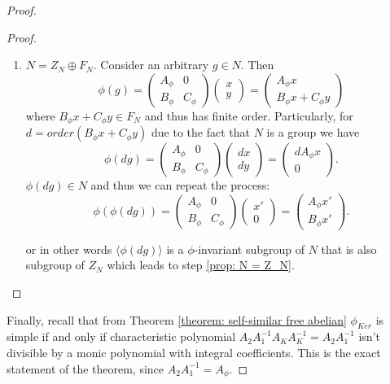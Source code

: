 \documentclass[a4paper,12pt]{amsart}
\theoremstyle{definition}
\begin{document}
\begin{proof}
\begin{proof}
\begin{enumerate}
				\item $N = Z_N \oplus F_N$. Consider an arbitrary $g \in N$. Then 
				$$
				\phi(g) = 
				\begin{pmatrix}
					A_\phi & 0 \\ 
					B_\phi & C_\phi   
				\end{pmatrix}
				\begin{pmatrix}
					x \\
					y
				\end{pmatrix}
				= \begin{pmatrix}
					A_\phi x \\ 
					B_\phi x + C_\phi y
				\end{pmatrix}
				$$ 
				where $B_\phi x + C_\phi y \in F_N$ and thus has finite order. Particularly, for $d = order(B_\phi x + C_\phi y)$ due to the fact that $N$ is a group we have 
				$$
				\phi(dg) = 
				\begin{pmatrix}
					A_\phi & 0 \\ 
					B_\phi & C_\phi   
				\end{pmatrix}
				\begin{pmatrix}
					dx \\
					dy
				\end{pmatrix}
				= \begin{pmatrix}
					dA_\phi x \\ 
					0
				\end{pmatrix}.
				$$
				$\phi(dg) \in N$ and thus we can repeat the process: 
				$$
				\phi(\phi(dg)) = 
				\begin{pmatrix}
					A_\phi & 0 \\ 
					B_\phi & C_\phi   
				\end{pmatrix}
				\begin{pmatrix}
					x' \\
					0
				\end{pmatrix}
				= \begin{pmatrix}
					A_\phi x' \\ 
					B_\phi x'
				\end{pmatrix}.
				$$
				
				or in other words $\langle \phi(dg)\rangle$ is a $\phi$-invariant subgroup of $N$ that is also subgroup of $Z_N$ which leads to step \ref{prop: N = Z_N}.
			\end{enumerate} 
		\end{proof}
		
		Finally, recall that from Theorem \ref{theorem: self-similar free abelian} $\phi_{Ker}$ is simple if and only if characteristic polynomial $A_2A_1^{-1} A_K A_K^{-1} = A_2A_1^{-1}$ isn't divisible by a monic polynomial with integral coefficients. This is the exact statement of the theorem, since $A_2A_1^{-1} = A_\phi$.
	

\end{proof}
\end{document}
